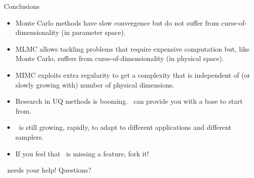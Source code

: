 \begin{frame}{Conclusions}
  \begin{itemize}
  \item Monte Carlo methods have slow convergence but do not suffer
    from curse-of-dimensionality (in parameter space).
  \item MLMC allows tackling problems that require expensive
    computation but, like Monte Carlo, suffers from
    curse-of-dimensionality (in physical space).
  \item MIMC exploits extra regularity to get a complexity that is
    independent of (or slowly growing with) number of physical
    dimensions.
  \pause
  \item Research in UQ methods is booming. \lib~can
    provide you with a base to start from.
  \item \lib~is still growing, rapidly, to adapt to
    different applications and different samplers.
  \item If you feel that \lib~is missing a feature, fork it!
  \end{itemize}
\end{frame}

\begin{frame}{\lib\ needs your help!}
Questions?
\end{frame}

